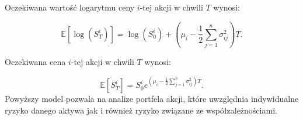 Oczekiwana wartość logarytmu ceny \( i \)-tej akcji w chwili \( T \) wynosi:

\begin{equation}
\mathbb{E}[\log(S_T^i)] = \log(S_0^i) + \left( \mu_i - \frac{1}{2} \sum_{j=1}^n \sigma_{ij}^2 \right) T.
\end{equation}

Oczekiwana cena \( i \)-tej akcji w chwili \( T \) wynosi:

\begin{equation}
\mathbb{E}[S_T^i] = S_0^i e^{\left( \mu_i - \frac{1}{2} \sum_{j=1}^n \sigma_{ij}^2 \right) T}.
\end{equation}
Powyższy model pozwala na analize portfela akcji, które uwzględnia indywidualne ryzyko danego aktywa jak i również ryzyko związane ze współzależnościami.

